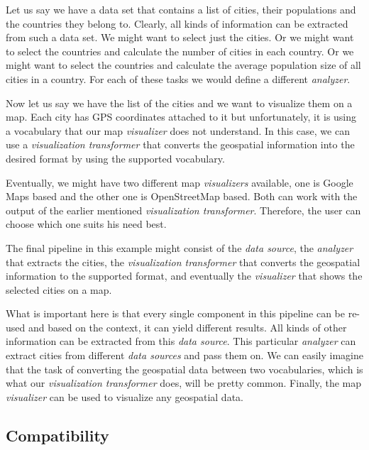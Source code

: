 Let us say we have a data set that contains a list of cities,  their populations and the countries they belong to. Clearly, all kinds of information can be extracted from such a data set. We might want to select just the cities. Or we might want to select the countries and calculate the number of cities in each country. Or we might want to select the countries and calculate the average population size of all cities in a country. For each of these tasks we would define a different \emph{analyzer}.

Now let us say we have the list of the cities and we want to visualize them on a map. Each city has GPS coordinates attached to it but unfortunately, it is using a vocabulary that our map \emph{visualizer} does not understand. In this case, we can use a \emph{visualization transformer} that converts the geospatial information into the desired format by using the supported vocabulary.

Eventually, we might have two different map \emph{visualizers} available, one is Google Maps based and the other one is OpenStreetMap based. Both can work with the output of the earlier mentioned \emph{visualization transformer}. Therefore, the user can choose which one suits his need best.

The final pipeline in this example might consist of the \emph{data source}, the \emph{analyzer} that extracts the cities, the \emph{visualization transformer} that converts the geospatial information to the supported format, and eventually the \emph{visualizer} that shows the selected cities on a map.

What is important here is that every single component in this pipeline can be re-used and based on the context, it can yield different results. All kinds of other information can be extracted from this \emph{data source}. This particular \emph{analyzer} can extract cities from different \emph{data sources} and pass them on. We can easily imagine that the task of converting the geospatial data between two vocabularies, which is what our \emph{visualization transformer} does, will be pretty common. Finally, the map \emph{visualizer} can be used to visualize any geospatial data.

\subsection{Compatibility}

